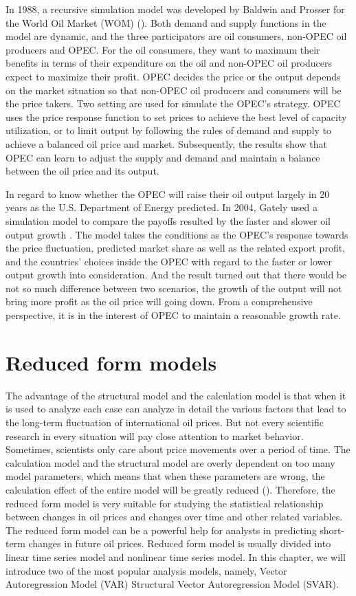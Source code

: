 In 1988, a recursive simulation model was developed by Baldwin and Prosser for the World Oil Market (WOM) (\cite{baldwin1988world}). Both demand and supply functions in the model are dynamic, and the three participators are oil consumers, non-OPEC oil producers and OPEC. For the oil consumers, they want to maximum their benefits in terms of their expenditure on the oil and non-OPEC oil producers expect to maximize their profit. OPEC decides the price or the output depends on the market situation so that non-OPEC oil producers and consumers will be the price takers. Two setting are used for simulate the OPEC's strategy. OPEC uses the price response function to set prices to achieve the best level of capacity utilization, or to limit output by following the rules of demand and supply to achieve a balanced oil price and market. Subsequently, the results show that OPEC can learn to adjust the supply and demand and maintain a balance between the oil price and its output.


In regard to know whether the OPEC will raise their oil output largely in 20 years as the U.S. Department of Energy predicted. In 2004, Gately used a simulation model to compare the payoffs resulted by the faster and slower oil output growth \cite{gately2004opec}. The model takes the conditions as the OPEC's response towards the price fluctuation, predicted market share as well as the related export profit, and the countries' choices inside the OPEC with regard to the faster or lower output growth into consideration. And the result turned out that there would be not so much difference between two scenarios, the growth of the output will not bring more profit as the oil price will going down. From a comprehensive perspective, it is in the interest of OPEC to maintain a reasonable growth rate.


\section{Reduced form models}
The advantage of the structural model and the calculation model is that when it is used to analyze each case can analyze in detail the various factors that lead to the long-term fluctuation of international oil prices. But not every scientific research in every situation will pay close attention to market behavior. Sometimes, scientists only care about price movements over a period of time. The calculation model and the structural model are overly dependent on too many model parameters, which means that when these parameters are wrong, the calculation effect of the entire model will be greatly reduced (\cite{huntington2013oil}). Therefore, the reduced form model is very suitable for studying the statistical relationship between changes in oil prices and changes over time and other related variables. The reduced form model can be a powerful help for analysts in predicting short-term changes in future oil prices. Reduced form model is usually divided into linear time series model and nonlinear time series model. In this chapter, we will introduce two of the most popular analysis models, namely, Vector Autoregression Model (VAR) Structural Vector Autoregression Model (SVAR).

